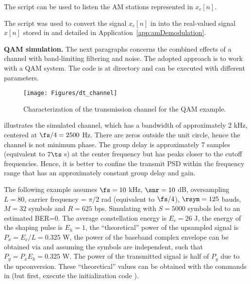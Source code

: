 The script  can be used to listen the AM stations represented in $x_c[n]$.

The script  was used to convert the signal $x_c[n]$
in  into the real-valued signal $x[n]$ stored in 
 and detailed in Application~\ref{app:amDemodulation}.
\eApplication

\bApplication \textbf{QAM simulation.}
\label{app:qam_simulation}
The next paragraphs concerns the combined effects of a channel with band-limiting filtering and noise. The adopted approach is to work with a QAM system. The code is at directory  and can be executed with different parameters.

\begin{figure}[htbp]
\centering
\texttt{[image: Figures/dt\_channel]}
\caption{Characterization of the transmission channel for the QAM example.\label{fig:dt_channel}}
\end{figure}

 illustrates the simulated channel, which has a bandwidth of approximately 2 kHz, centered at $\fs/4=2500$ Hz. There are zeros outside the unit circle, hence the channel is not minimum phase. The group delay is approximately 7 samples (equivalent to $7 \ts$ s) at the center frequency but has peaks closer to the cutoff frequencies. Hence, it is better to confine the transmit PSD within the frequency range that has an approximately constant group delay and gain.

The following example assumes $\fs=10$ kHz, $\snr=10$ dB, oversampling $L=80$, carrier frequency = $\pi/2$ rad (equivalent to $\fs/4$), $\rsym=125$ bauds, $M=32$ symbols and $R=625$ bps. Simulating with $S=5000$ symbols led to an estimated BER=0.
The average constellation energy is $E_c = 26$ J, the energy of the shaping pulse is $E_h=1$, the ``theoretical'' power of the upsampled signal is $P_x=E_c/L=0.325$ W, the power of the baseband complex envelope can be obtained via  and assuming the symbols are independent, such that $P_y = P_x E_h = 0.325$ W. The power of the transmitted signal is half of $P_y$ due to the upconversion. These ``theoretical'' values can be obtained with the commands in  (but first, execute the initialization code ).


